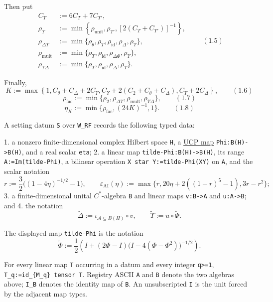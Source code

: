 \begin{definition}
Then put
\[
\begin{aligned}
C_\Upsilon&:=6C_T+7C_{\Upsilon'},\\
\rho_\Upsilon&:=\min\left\{
\rho_{\mathrm{unit}},\rho_{\Upsilon'},
[2(C_T+C_{\Upsilon'})]^{-1}
\right\},\\
\rho_{\Delta\Upsilon}&:=\min\{
\rho_\theta,\rho_T,\rho_{\mathrm{id}},\rho_\Delta,\rho_\Upsilon\},\\
\rho_{\mathrm{mult}}&:=\min\{
\rho_T,\rho_{\mathrm{id}},\rho_{\Delta\Phi},\rho_\Upsilon\},\\
\rho_{\Upsilon\Delta}&:=\min\{
\rho_T,\rho_{\mathrm{id}},\rho_\Delta,\rho_\Upsilon\}.
\end{aligned}
\qquad (1.5)
\]

Finally,
\[
K:=\max\left\{
1,
C_\theta+C_\Delta+2C_\Upsilon,
C_\Upsilon+2(C_2+C_\theta+C_\Delta),
C_\Upsilon+2C_\Delta
\right\},
\qquad (1.6)
\]
\[
\rho_{\mathrm{fac}}:=\min\{
\rho_2,\rho_{\Delta\Upsilon},\rho_{\mathrm{mult}},
\rho_{\Upsilon\Delta}
\},
\qquad (1.7)
\]
\[
\eta_K:=\min\{\rho_{\mathrm{fac}},(24K)^{-1},1\}.
\qquad (1.8)
\]

A setting datum \texttt{S} over \texttt{W\_RF} records the following typed data:

1. a nonzero finite-dimensional complex Hilbert space \texttt{H}, a
   \hyperref[def:ucp-map]{UCP map} \texttt{Phi:\allowbreak{}B(H)-\textgreater{}B(H)}, and a real scalar \texttt{eta};
2. a linear map \texttt{tilde-\allowbreak{}Phi:\allowbreak{}B(H)-\textgreater{}B(H)}, its range \texttt{A:\allowbreak{}=Im(tilde-\allowbreak{}Phi)}, a
   bilinear operation \texttt{X star Y:\allowbreak{}=tilde-\allowbreak{}Phi(XY)} on \texttt{A}, and the scalar
   notation
   \[
   r:=\frac32\bigl((1-4\eta)^{-1/2}-1\bigr),
   \qquad
   \varepsilon_{\mathrm{AI}}(\eta):=
   \max\{r,20\eta+2((1+r)^5-1),3r-r^2\};
   \]
3. a finite-dimensional unital $C^{*}$-algebra \texttt{B} and linear maps \texttt{v:\allowbreak{}B-\textgreater{}A} and
   \texttt{u:\allowbreak{}A-\textgreater{}B}; and
4. the notation
   \[
   \widetilde\Delta:=\iota_{\mathcal A\subseteq B(H)}\circ v,
   \qquad
   \widetilde\Upsilon:=u\circ\widetilde\Phi.
   \]

The displayed map \texttt{tilde-\allowbreak{}Phi} is the notation
\[
\widetilde\Phi
:=\frac12\left(I+(2\Phi-I)
\bigl(I-4(\Phi-\Phi^2)\bigr)^{-1/2}\right).
\]

For every linear map \texttt{T} occurring in a datum and every integer \texttt{q\textgreater{}=1},
\texttt{T\_q:\allowbreak{}=id\_\{M\_q\} tensor T}.  Registry ASCII \texttt{A} and \texttt{B} denote the two
algebras above; \texttt{I\_B} denotes the identity map of \texttt{B}.  An unsubscripted \texttt{I} is the
unit forced by the adjacent map types.
\end{definition}
